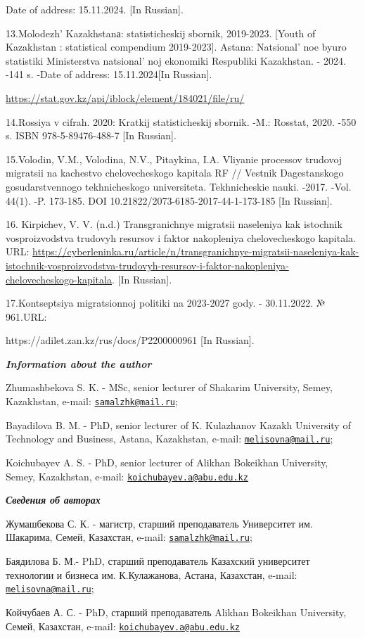 Date of address: 15.11.2024. {[}In Russian{]}.

13.Molodezh'{} Kazakhstanа: statisticheskij sbornik,
2019-2023. {[}Youth of Kazakhstan : statistical compendium 2019-2023{]}.
Astana: Natsional' noe byuro statistiki Ministerstva
natsional' noj ekonomiki Respubliki Kazakhstan. - 2024.
-141 s. -Date of address: 15.11.2024{[}In Russian{]}.

\url{https://stat.gov.kz/api/iblock/element/184021/file/ru/}

14.Rossiya v cifrah. 2020: Kratkij statisticheskij sbornik. -M.:
Rosstat, 2020. -550 s. ISBN 978-5-89476-488-7 {[}In Russian{]}.

15.Volodin, V.M., Volodina, N.V., Pitaykina, I.A. Vliyanie processov
trudovoj migratsii na kachestvo chelovecheskogo kapitala RF // Vestnik
Dagestanskogo gosudarstvennogo tekhnicheskogo universiteta.
Tekhnicheskie nauki. -2017. -Vol. 44(1). -P. 173-185. DOI
10.21822/2073-6185-2017-44-1-173-185 {[}In Russian{]}.

16. Kirpichev, V. V. (n.d.) Transgranichnye migratsii naseleniya kak
istochnik vosproizvodstva trudovyh resursov i faktor nakopleniya
chelovecheskogo kapitala. URL:
\url{https://cyberleninka.ru/article/n/transgranichnye-migratsii-naseleniya-kak-istochnik-vosproizvodstva-trudovyh-resursov-i-faktor-nakopleniya-chelovecheskogo-kapitala}.
{[}In Russian{]}.

17.Kontseptsiya migratsionnoj politiki na 2023-2027 gody. - 30.11.2022.
№ 961.URL:

https://adilet.zan.kz/rus/docs/P2200000961 {[}In Russian{]}.

\emph{{\bfseries Information about the author}}

Zhumashbekova S. K. - MSc, senior lecturer of Shakarim University,
Semey, Kazakhstan, e-mail:
\href{mailto:samalzhk@mail.ru}{\nolinkurl{samalzhk@mail.ru}};

Bayadilova B. M. - PhD, senior lecturer of K. Kulazhanov Kazakh
University of Technology and Business, Astana, Kazakhstan, e-mail:
\href{mailto:melisovna@mail.ru}{\nolinkurl{melisovna@mail.ru}};

Koichubayev A. S. - PhD, senior lecturer of Alikhan Bokeikhan
University, Semey, Kazakhstan, e-mail:
\href{mailto:koichubayev.a@abu.edu.kz}{\nolinkurl{koichubayev.a@abu.edu.kz}}

\emph{{\bfseries Сведения об авторах}}

Жумашбекова С. К. - магистр, старший преподаватель Университет им.
Шакарима, Семей, Казахстан, e-mail:
\href{mailto:samalzhk@mail.ru}{\nolinkurl{samalzhk@mail.ru}};

Баядилова Б. М.- PhD, старший преподаватель Казахский университет
технологии и бизнеса им. К.Кулажанова, Астана, Казахстан, e-mail:
\href{mailto:melisovna@mail.ru}{\nolinkurl{melisovna@mail.ru}};

Койчубаев А. С. - PhD, старший преподаватель Alikhan Bokeikhan
University, Семей, Казахстан, e-mail:
\href{mailto:koichubayev.a@abu.edu.kz}{\nolinkurl{koichubayev.a@abu.edu.kz}}
